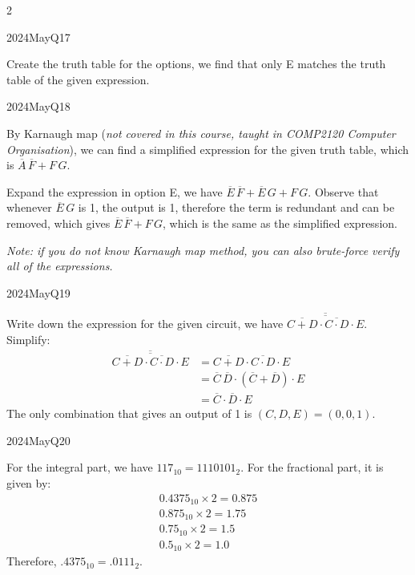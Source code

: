 \begin{multicols}{2}
\begin{qsolution}{2024}{May}{Q17}{\tgCE \tgCELogicalCircuits}

    Create the truth table for the options, we find that only E matches the truth table of the given expression.
\end{qsolution}

\begin{qsolution}{2024}{May}{Q18}{\tgCE \tgCELogicalCircuits}

    By Karnaugh map ({\itshape not covered in this course, taught in COMP2120 Computer Organisation}), we can find a simplified expression for the given truth table, which is $\overline A\,\overline F+F\,G$.

    Expand the expression in option E, we have $\overline E\,\overline F+\overline E\,G+F\,G$.
    Observe that whenever $\overline E\,G$ is 1, the output is 1, therefore the term is redundant and can be removed, which gives $\overline E\,\overline F+F\,G$, which is the same as the simplified expression.

    \itshape Note: if you do not know Karnaugh map method, you can also brute-force verify all of the expressions.
\end{qsolution}

\begin{qsolution}{2024}{May}{Q19}{\tgCE \tgCELogicalCircuits}

    Write down the expression for the given circuit, we have $\overline{\overline{\overline{C+D}\cdot\overline{C\cdot D}\cdot E}}$.
    Simplify:
    \begin{align*}
        \overline{\overline{\overline{C+D}\cdot\overline{C\cdot D}\cdot E}}
        &= \overline{C+D}\cdot\overline{C\cdot D}\cdot E\\
        &= \overline C\,\overline D\cdot(\overline C+\overline D)\cdot E\\
        &= \overline C\cdot\overline D\cdot E
    \end{align*}
    The only combination that gives an output of 1 is $(C,D,E)=(0,0,1)$.
\end{qsolution}

\begin{qsolution}{2024}{May}{Q20}{\tgCE \tgCEFixedPointRepr}

    For the integral part, we have $117_{10}=1110101_2$.
    For the fractional part, it is given by:
    \begin{align*}
        0.4375_{10}\times 2 = \boxed{0}.875\\
        0.875_{10}\times 2 = \boxed{1}.75\\
        0.75_{10}\times 2 = \boxed{1}.5\\
        0.5_{10}\times 2 = \boxed{1}.0
    \end{align*}
    Therefore, $.4375_{10}=.0111_2$.


\end{qsolution}
\end{multicols}
